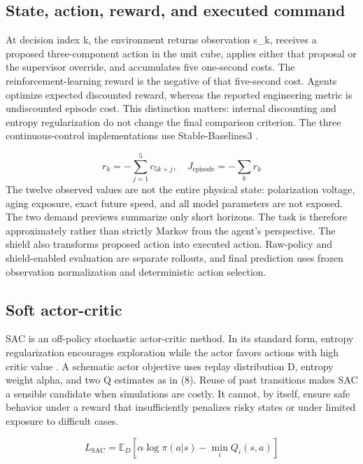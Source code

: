 \documentclass[conference]{IEEEtran}
\begin{document}
\subsection{State, action, reward, and executed command}
At decision index k, the environment returns observation s\_k, receives a proposed three-component action in the unit cube, applies either that proposal or the supervisor override, and accumulates five one-second costs. The reinforcement-learning reward is the negative of that five-second cost. Agents optimize expected discounted reward, whereas the reported engineering metric is undiscounted episode cost. This distinction matters: internal discounting and entropy regularization do not change the final comparison criterion. The three continuous-control implementations use Stable-Baselines3 \cite{r15}.

\begin{equation}
r_k=-\sum_{j=1}^{5}c_{5k+j},\quad J_{\mathrm{episode}}=-\sum_k r_k
\label{eq:7}
\end{equation}
The twelve observed values are not the entire physical state: polarization voltage, aging exposure, exact future speed, and all model parameters are not exposed. The two demand previews summarize only short horizons. The task is therefore approximately rather than strictly Markov from the agent's perspective. The shield also transforms proposed action into executed action. Raw-policy and shield-enabled evaluation are separate rollouts, and final prediction uses frozen observation normalization and deterministic action selection.

\subsection{Soft actor-critic}
SAC is an off-policy stochastic actor-critic method. In its standard form, entropy regularization encourages exploration while the actor favors actions with high critic value \cite{r3}. A schematic actor objective uses replay distribution D, entropy weight alpha, and two Q estimates as in (8). Reuse of past transitions makes SAC a sensible candidate when simulations are costly. It cannot, by itself, ensure safe behavior under a reward that insufficiently penalizes risky states or under limited exposure to difficult cases.

\begin{equation}
L_{\mathrm{SAC}}=\mathbb{E}_{D}[\alpha\log\pi(a|s)-\min_i Q_i(s,a)]
\label{eq:8}
\end{equation}
\end{document}
